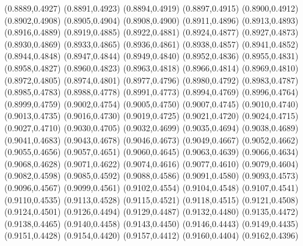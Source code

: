 \PST@Cross(0.8889,0.4927)
\PST@Cross(0.8891,0.4923)
\PST@Cross(0.8894,0.4919)
\PST@Cross(0.8897,0.4915)
\PST@Cross(0.8900,0.4912)
\PST@Cross(0.8902,0.4908)
\PST@Cross(0.8905,0.4904)
\PST@Cross(0.8908,0.4900)
\PST@Cross(0.8911,0.4896)
\PST@Cross(0.8913,0.4893)
\PST@Cross(0.8916,0.4889)
\PST@Cross(0.8919,0.4885)
\PST@Cross(0.8922,0.4881)
\PST@Cross(0.8924,0.4877)
\PST@Cross(0.8927,0.4873)
\PST@Cross(0.8930,0.4869)
\PST@Cross(0.8933,0.4865)
\PST@Cross(0.8936,0.4861)
\PST@Cross(0.8938,0.4857)
\PST@Cross(0.8941,0.4852)
\PST@Cross(0.8944,0.4848)
\PST@Cross(0.8947,0.4844)
\PST@Cross(0.8949,0.4840)
\PST@Cross(0.8952,0.4836)
\PST@Cross(0.8955,0.4831)
\PST@Cross(0.8958,0.4827)
\PST@Cross(0.8960,0.4823)
\PST@Cross(0.8963,0.4818)
\PST@Cross(0.8966,0.4814)
\PST@Cross(0.8969,0.4810)
\PST@Cross(0.8972,0.4805)
\PST@Cross(0.8974,0.4801)
\PST@Cross(0.8977,0.4796)
\PST@Cross(0.8980,0.4792)
\PST@Cross(0.8983,0.4787)
\PST@Cross(0.8985,0.4783)
\PST@Cross(0.8988,0.4778)
\PST@Cross(0.8991,0.4773)
\PST@Cross(0.8994,0.4769)
\PST@Cross(0.8996,0.4764)
\PST@Cross(0.8999,0.4759)
\PST@Cross(0.9002,0.4754)
\PST@Cross(0.9005,0.4750)
\PST@Cross(0.9007,0.4745)
\PST@Cross(0.9010,0.4740)
\PST@Cross(0.9013,0.4735)
\PST@Cross(0.9016,0.4730)
\PST@Cross(0.9019,0.4725)
\PST@Cross(0.9021,0.4720)
\PST@Cross(0.9024,0.4715)
\PST@Cross(0.9027,0.4710)
\PST@Cross(0.9030,0.4705)
\PST@Cross(0.9032,0.4699)
\PST@Cross(0.9035,0.4694)
\PST@Cross(0.9038,0.4689)
\PST@Cross(0.9041,0.4683)
\PST@Cross(0.9043,0.4678)
\PST@Cross(0.9046,0.4673)
\PST@Cross(0.9049,0.4667)
\PST@Cross(0.9052,0.4662)
\PST@Cross(0.9055,0.4656)
\PST@Cross(0.9057,0.4651)
\PST@Cross(0.9060,0.4645)
\PST@Cross(0.9063,0.4639)
\PST@Cross(0.9066,0.4634)
\PST@Cross(0.9068,0.4628)
\PST@Cross(0.9071,0.4622)
\PST@Cross(0.9074,0.4616)
\PST@Cross(0.9077,0.4610)
\PST@Cross(0.9079,0.4604)
\PST@Cross(0.9082,0.4598)
\PST@Cross(0.9085,0.4592)
\PST@Cross(0.9088,0.4586)
\PST@Cross(0.9091,0.4580)
\PST@Cross(0.9093,0.4573)
\PST@Cross(0.9096,0.4567)
\PST@Cross(0.9099,0.4561)
\PST@Cross(0.9102,0.4554)
\PST@Cross(0.9104,0.4548)
\PST@Cross(0.9107,0.4541)
\PST@Cross(0.9110,0.4535)
\PST@Cross(0.9113,0.4528)
\PST@Cross(0.9115,0.4521)
\PST@Cross(0.9118,0.4515)
\PST@Cross(0.9121,0.4508)
\PST@Cross(0.9124,0.4501)
\PST@Cross(0.9126,0.4494)
\PST@Cross(0.9129,0.4487)
\PST@Cross(0.9132,0.4480)
\PST@Cross(0.9135,0.4472)
\PST@Cross(0.9138,0.4465)
\PST@Cross(0.9140,0.4458)
\PST@Cross(0.9143,0.4450)
\PST@Cross(0.9146,0.4443)
\PST@Cross(0.9149,0.4435)
\PST@Cross(0.9151,0.4428)
\PST@Cross(0.9154,0.4420)
\PST@Cross(0.9157,0.4412)
\PST@Cross(0.9160,0.4404)
\PST@Cross(0.9162,0.4396)
